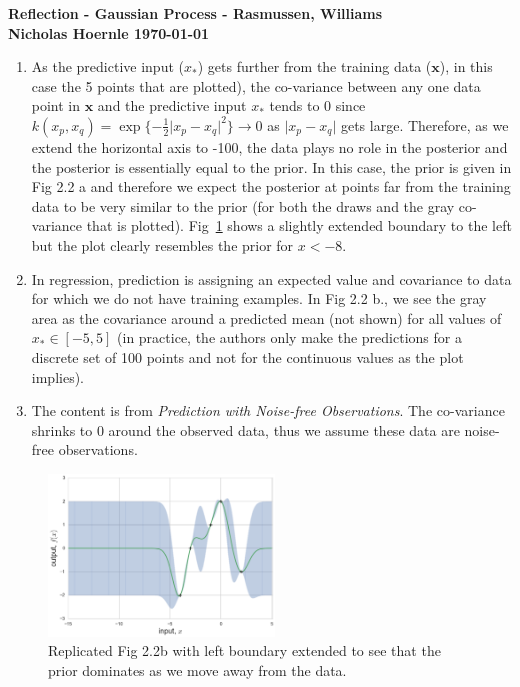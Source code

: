 \documentclass[twoside]{article}
\begin{document}
\textbf{Reflection - Gaussian Process - Rasmussen, Williams}\\
\textbf{Nicholas Hoernle \hfill \today}

\begin{enumerate}
  \item As the predictive input ($x_*$) gets further from the training data ($\mathbf{x}$), in this case the 5 points that are plotted), the co-variance between any one data point in $\mathbf{x}$ and the predictive input $x_*$ tends to 0 since $k(x_p, x_q) = \exp \{ -\frac{1}{2} \vert x_p - x_q \vert ^2 \} \rightarrow 0$ as $\vert x_p - x_q \vert$ gets large. Therefore, as we extend the horizontal axis to -100, the data plays no role in the posterior and the posterior is essentially equal to the prior. In this case, the prior is given in Fig 2.2 a and therefore we expect the posterior at points far from the training data to be very similar to the prior (for both the draws and the gray co-variance that is plotted). Fig~\ref{problem_distribution} shows a slightly extended boundary to the left but the plot clearly resembles the prior for $x < -8$.
  \item In regression, prediction is assigning an expected value and covariance to data for which we do not have training examples. In Fig 2.2 b., we see the gray area as the covariance around a predicted mean (not shown) for all values of $x_* \in [-5,5]$ (in practice, the authors only make the predictions for a discrete set of 100 points and not for the continuous values as the plot implies).
  \item The content is from \textit{Prediction with Noise-free Observations}. The co-variance shrinks to $0$ around the observed data, thus we assume these data are noise-free observations.
\end{enumerate}

\begin{figure}[h]
\centering
\includegraphics[width=6cm]{fig2_2breplication.png}
\caption{Replicated Fig 2.2b with left boundary extended to see that the prior dominates as we move away from the data.}\label{problem_distribution}
\end{figure}


% 
\end{document}

